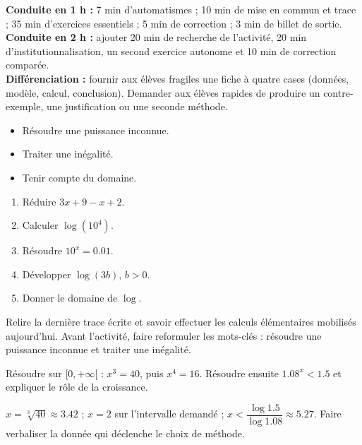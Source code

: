 \ifmxteacher
\begin{method}
\textbf{Conduite en 1 h :} 7 min d'automatismes ; 10 min de mise en commun et trace ; 35 min d'exercices essentiels ; 5 min de correction ; 3 min de billet de sortie.\\
\textbf{Conduite en 2 h :} ajouter 20 min de recherche de l'activité, 20 min d'institutionnalisation, un second exercice autonome et 10 min de correction comparée.\\
\textbf{Différenciation :} fournir aux élèves fragiles une fiche à quatre cases (données, modèle, calcul, conclusion). Demander aux élèves rapides de produire un contre-exemple, une justification ou une seconde méthode.
\end{method}
\fi
{}
\begin{objectives}\begin{itemize}\item Résoudre une puissance inconnue.\item Traiter une inégalité.\item Tenir compte du domaine.\end{itemize}\end{objectives}
\begin{fluency}\begin{enumerate}\item Réduire $3x+9-x+2$. \item Calculer $\log(10^4)$. \item Résoudre $10^x=\num{0,01}$. \item Développer $\log(3b)$, $b>0$. \item Donner le domaine de $\log$. \mxblank{$]0,+\infty[$}\end{enumerate}\end{fluency}
\begin{prerequisites}Relire la dernière trace écrite et savoir effectuer les calculs élémentaires mobilisés aujourd'hui. Avant l'activité, faire reformuler les mots-clés : résoudre une puissance inconnue et traiter une inégalité.\end{prerequisites}

\begin{activity}
Résoudre sur $[0,+\infty[$ : $x^3=40$, puis $x^4=16$. Résoudre ensuite $\num{1,08}^x<\num{1,5}$ et expliquer le rôle de la croissance.

\end{activity}
\begin{solution}$x=\sqrt[3]{40}\approx\num{3,42}$ ; $x=2$ sur l'intervalle demandé ; $x<\dfrac{\log\num{1,5}}{\log\num{1,08}}\approx\num{5,27}$. Faire verbaliser la donnée qui déclenche le choix de méthode.\end{solution}

